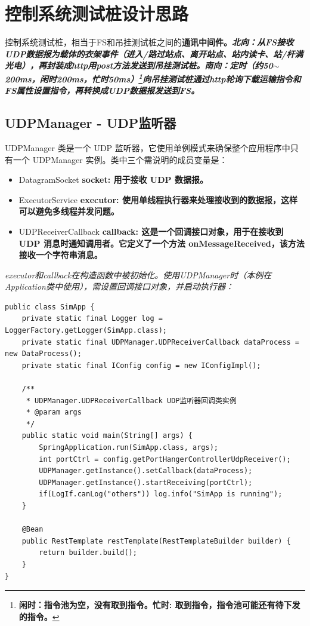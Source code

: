 \section{控制系统测试桩设计思路}
控制系统测试桩，相当于FS和吊挂测试桩之间的\bf{通讯中间件}。\it{北向}：从FS接收UDP数据报为载体的衣架事件（进入/路过站点、离开站点、站内读卡、站/杆满光电），再封装成http用post方法发送到吊挂测试桩。\it{南向}：定时（约50$\sim$200ms，闲时200ms，忙时50ms）\footnote{\bf{闲时}：指令池为空，没有取到指令。\bf{忙时}: 取到指令，指令池可能还有待下发的指令。}向吊挂测试桩通过http轮询下载运输指令和FS属性设置指令，再转换成UDP数据报发送到FS。

\subsection{UDPManager - UDP监听器}
UDPManager 类是一个 UDP 监听器，它使用单例模式来确保整个应用程序中只有一个 UDPManager 实例。类中三个需说明的成员变量是：
\begin{itemize}
	\item DatagramSocket \bf{socket}: 用于接收 UDP 数据报。
	\item ExecutorService \bf{executor}: 使用单线程执行器来处理接收到的数据报，这样可以避免多线程并发问题。
	\item UDPReceiverCallback \bf{callback}: 这是一个回调接口对象，用于在接收到 UDP 消息时通知调用者。它定义了一个方法 onMessageReceived，该方法接收一个字符串消息。
\end{itemize}
\it{executor}和\it{callback}在构造函数中被初始化。使用UDPManager时（本例在Application类中使用），需设置回调接口对象，并启动执行器：\label{code:simapp}
\begin{lstlisting}
public class SimApp {
    private static final Logger log = LoggerFactory.getLogger(SimApp.class);
    private static final UDPManager.UDPReceiverCallback dataProcess = new DataProcess();
    private static final IConfig config = new IConfigImpl();

    /**
     * UDPManager.UDPReceiverCallback UDP监听器回调类实例
     * @param args
     */
    public static void main(String[] args) {
        SpringApplication.run(SimApp.class, args);
        int portCtrl = config.getPortHangerControllerUdpReceiver();
        UDPManager.getInstance().setCallback(dataProcess);
        UDPManager.getInstance().startReceiving(portCtrl);
        if(LogIf.canLog("others")) log.info("SimApp is running");
    }

    @Bean
    public RestTemplate restTemplate(RestTemplateBuilder builder) {
        return builder.build();
    }
}
\end{lstlisting}\vspace{-30pt}
